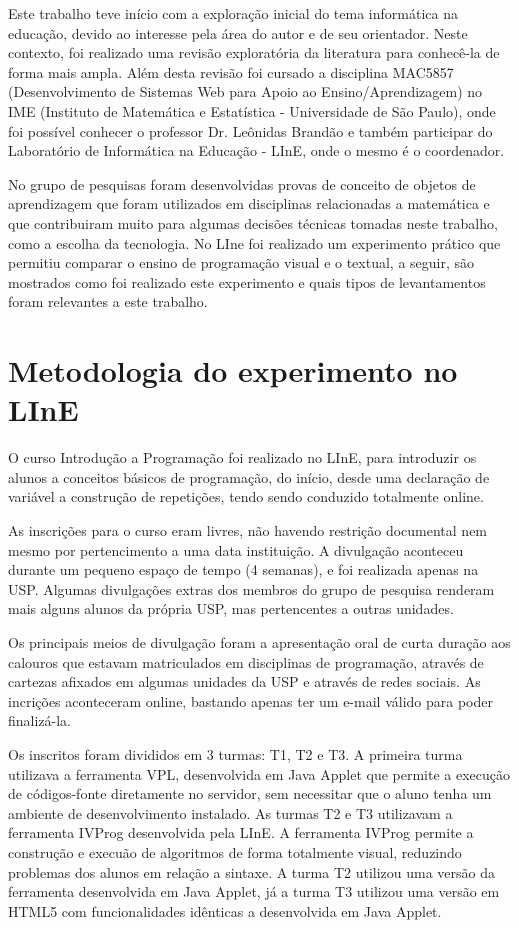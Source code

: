 Este trabalho teve início com a exploração inicial do tema informática na educação, devido ao interesse pela área do autor e de seu orientador. Neste contexto, foi realizado uma revisão exploratória da literatura para conhecê-la de forma mais ampla. Além desta revisão foi cursado a disciplina MAC5857 (Desenvolvimento de Sistemas Web para Apoio ao Ensino/Aprendizagem) no IME (Instituto de Matemática e Estatística - Universidade de São Paulo), onde foi possível conhecer o professor Dr. Leônidas Brandão e também participar do Laboratório de Informática na Educação - LInE, onde o mesmo é o coordenador.

No grupo de pesquisas foram desenvolvidas provas de conceito de objetos de aprendizagem que foram utilizados em disciplinas relacionadas a matemática e que contribuiram muito para algumas decisões técnicas tomadas neste trabalho, como a escolha da tecnologia. No LIne foi realizado um experimento prático que permitiu comparar o ensino de programação visual e o textual, a seguir, são mostrados como foi realizado este experimento e quais tipos de levantamentos foram relevantes a este trabalho.

\section{Metodologia do experimento no LInE}

O curso Introdução a Programação foi realizado no LInE, para introduzir os alunos a conceitos básicos de programação, do início, desde uma declaração de variável a construção de repetições, tendo sendo conduzido totalmente online.

As inscrições para o curso eram livres, não havendo restrição documental nem mesmo por pertencimento a uma data instituição. A divulgação aconteceu durante um pequeno espaço de tempo (4 semanas), e foi realizada apenas na USP. Algumas divulgações extras dos membros do grupo de pesquisa renderam mais alguns alunos da própria USP, mas pertencentes a outras unidades.

Os principais meios de divulgação foram a apresentação oral de curta duração aos calouros que estavam matriculados em disciplinas de programação, através de cartezas afixados em algumas unidades da USP e através de redes sociais. As incrições aconteceram online, bastando apenas ter um e-mail válido para poder finalizá-la.

Os inscritos foram divididos em 3 turmas: T1, T2 e T3. A primeira turma utilizava a ferramenta VPL, desenvolvida em Java Applet que permite a execução de códigos-fonte diretamente no servidor, sem necessitar que o aluno tenha um ambiente de desenvolvimento instalado. As turmas T2 e T3 utilizavam a ferramenta IVProg desenvolvida pela LInE. A ferramenta IVProg permite a construção e execuão de algoritmos de forma totalmente visual, reduzindo problemas dos alunos em relação a sintaxe. A turma T2 utilizou uma versão da ferramenta desenvolvida em Java Applet, já a turma T3 utilizou uma versão em HTML5 com funcionalidades idênticas a desenvolvida em Java Applet.


